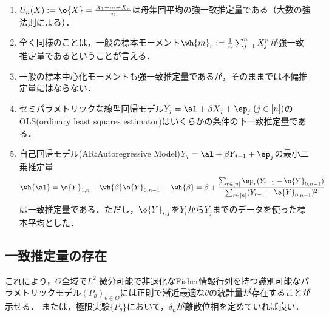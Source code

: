 \documentclass[uplatex,dvipdfmx]{jsreport}
\begin{document}
\begin{example}[一致推定量]\mbox{}
    \begin{enumerate}
        \item $U_n(X):=\o{X}=\frac{X_1+\cdots+X_n}{n}$は母集団平均の強一致推定量である（大数の強法則による）．
        \item 全く同様のことは，一般の標本モーメント$\wh{m}_r:=\frac{1}{n}\sum^n_{j=1}X_j^r$が強一致推定量であるということが言える．
        \item 一般の標本中心化モーメントも強一致推定量であるが，そのままでは不偏推定量にはならない．
        \item セミパラメトリックな線型回帰モデル$Y_j=\al+\beta X_j+\ep_j\;(j\in[n])$のOLS(ordinary least squares estimator)はいくらかの条件の下一致推定量である．
        \item 自己回帰モデル(AR:Autoregressive Model)$Y_j=\al+\beta Y_{j-1}+\ep_j$の最小二乗推定量
        \[\wh{\al}=\o{Y}_{1,n}-\wh{\beta}\o{Y}_{0,n-1},\quad\wh{\beta}=\beta+\frac{\sum_{r\in[n]}\ep_r(Y_{r-1}-\o{Y}_{0,n-1})}{\sum_{r\in[n]}(Y_{r-1}-\o{Y}_{0,n-1})^2}\]
        は一致推定量である．ただし，$\o{Y}_{i,j}$を$Y_i$から$Y_j$までのデータを使った標本平均とした．
    \end{enumerate}
\end{example}

\subsection{一致推定量の存在}

\begin{tcolorbox}[colframe=ForestGreen, colback=ForestGreen!10!white,breakable,colbacktitle=ForestGreen!40!white,coltitle=black,fonttitle=\bfseries\sffamily,
title=]
    これにより，$\Theta$全域で$L^2$-微分可能で非退化なFisher情報行列を持つ識別可能なパラメトリックモデル$(P_\theta)_{\theta\in\Theta}$には正則で漸近最適な$\theta$の統計量が存在することが示せる．
    または，極限実験$\{P_\theta\}$において，$\delta_n$が離散位相を定めていれば良い．
\end{tcolorbox}
\end{document}
